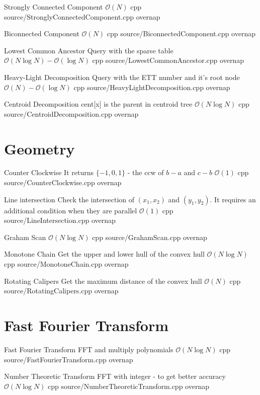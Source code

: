\documentclass[landscape, 10pt, a4paper, oneside, twocolumn]{extarticle}
\begin{document}
\Algorithm
{Strongly Connected Component}
{}
{$\mathcal{O}(N)$}
{cpp}
{source/StronglyConnectedComponent.cpp}
{overnap}

\Algorithm
{Biconnected Component}
{}
{$\mathcal{O}(N)$}
{cpp}
{source/BiconnectedComponent.cpp}
{overnap}

\Algorithm
{Lowest Common Ancestor}
{Query with the sparse table}
{$\mathcal{O}(N\log{N})-\mathcal{O}(\log{N})$}
{cpp}
{source/LowestCommonAncestor.cpp}
{overnap}

\Algorithm
{Heavy-Light Decomposition}
{Query with the ETT number and it's root node}
{$\mathcal{O}(N)-\mathcal{O}(\log{N})$}
{cpp}
{source/HeavyLightDecomposition.cpp}
{overnap}

\Algorithm
{Centroid Decomposition}
{cent[x] is the parent in centroid tree}
{$\mathcal{O}(N\log{N})$}
{cpp}
{source/CentroidDecomposition.cpp}
{overnap}


\section{Geometry}

\Algorithm
{Counter Clockwise}
{It returns $\{-1, 0, 1\}$ - the ccw of $b-a$ and $c-b$}
{$\mathcal{O}(1)$}
{cpp}
{source/CounterClockwise.cpp}
{overnap}

\Algorithm
{Line intersection}
{Check the intersection of $(x_1, x_2)$ and $(y_1, y_2)$. It requires an additional condition when they are parallel}
{$\mathcal{O}(1)$}
{cpp}
{source/LineIntersection.cpp}
{overnap}

\Algorithm
{Graham Scan}
{}
{$\mathcal{O}(N\log{N})$}
{cpp}
{source/GrahamScan.cpp}
{overnap}

\Algorithm
{Monotone Chain}
{Get the upper and lower hull of the convex hull}
{$\mathcal{O}(N\log{N})$}
{cpp}
{source/MonotoneChain.cpp}
{overnap}

\Algorithm
{Rotating Calipers}
{Get the maximum distance of the convex hull}
{$\mathcal{O}(N)$}
{cpp}
{source/RotatingCalipers.cpp}
{overnap}


\section{Fast Fourier Transform}

\Algorithm
{Fast Fourier Transform}
{FFT and multiply polynomials}
{$\mathcal{O}(N\log{N})$}
{cpp}
{source/FastFourierTransform.cpp}
{overnap}

\Algorithm
{Number Theoretic Transform}
{FFT with integer - to get better accuracy}
{$\mathcal{O}(N\log{N})$}
{cpp}
{source/NumberTheoreticTransform.cpp}
{overnap}
\end{document}
